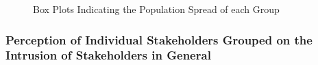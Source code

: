 \begin{figure}[htp]
\hspace{1em}
\caption{Box Plots Indicating the Population Spread of each Group}
\label{fig:st3}
\end{figure}


\subsubsection{Perception of Individual Stakeholders Grouped on the Intrusion of Stakeholders in General}

